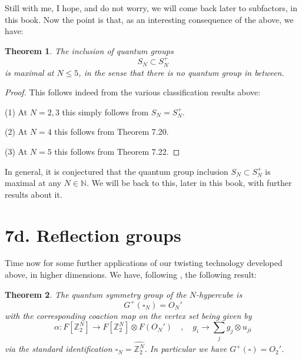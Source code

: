 \documentclass[12pt]{amsbook}
\newtheorem{theorem}{Theorem}[chapter]
\begin{document}
Still with me, I hope, and do not worry, we will come back later to subfactors, in this book. Now the point is that, as an interesting consequence of the above, we have:

\begin{theorem}
The inclusion of quantum groups
$$S_N\subset S_N^+$$
is maximal at $N\leq5$, in the sense that there is no quantum group in between.
\end{theorem}

\begin{proof} 
This follows indeed from the various classification results above:

\medskip

(1) At $N=2,3$ this simply follows from $S_N=S_N^+$.

\medskip

(2) At $N=4$ this follows from Theorem 7.20.

\medskip

(3) At $N=5$ this follows from Theorem 7.22.
\end{proof}

In general, it is conjectured that the quantum group inclusion $S_N\subset S_N^+$ is maximal at any $N\in\mathbb N$. We will be back to this, later in this book, with further results about it.

\section*{7d. Reflection groups}

Time now for some further applications of our twisting technology developed above, in higher dimensions. We have, following \cite{bbc}, the following result:


\begin{theorem}
The quantum symmetry group of the $N$-hypercube is
$$G^+(\square_N)=O_N'$$
with the corresponding coaction map on the vertex set being given by
$$\alpha:F[\mathbb Z_2^N]\to F[\mathbb Z_2^N]\otimes F(O_N')\quad,\quad 
g_i\to\sum_jg_j\otimes u_{ji}$$
via the standard identification $\square_N=\widehat{\mathbb Z_2^N}$. In particular we have $G^+(\square)=O_2'$.
\end{theorem} 
\end{document}
